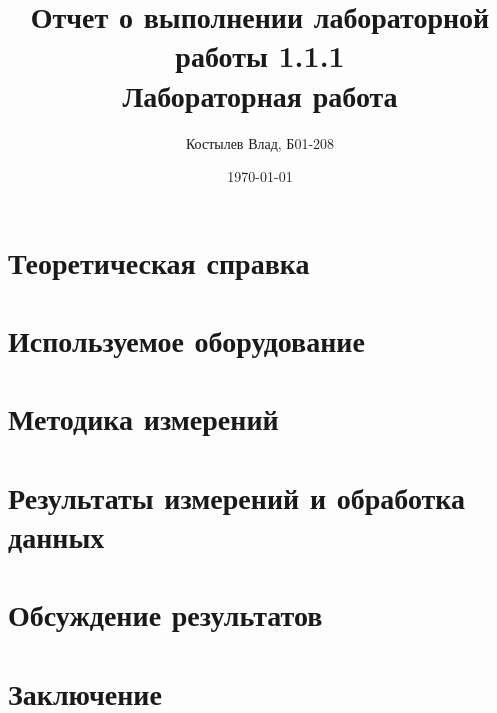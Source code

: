 \documentclass[a4paper, 12pt]{article}
\author{Костылев Влад, Б01-208}
\date{\today}
\title{Отчет о выполнении лабораторной работы 1.1.1 \\ \textbf{Лабораторная работа} }
\begin{document}
\maketitle

\begin{abstract}

\end{abstract}

\section {Теоретическая справка} 


\section {Используемое оборудование}


\section {Методика измерений}


\section {Результаты измерений и обработка данных} 


\section {Обсуждение результатов} 


\section {Заключение}
\end{document}
